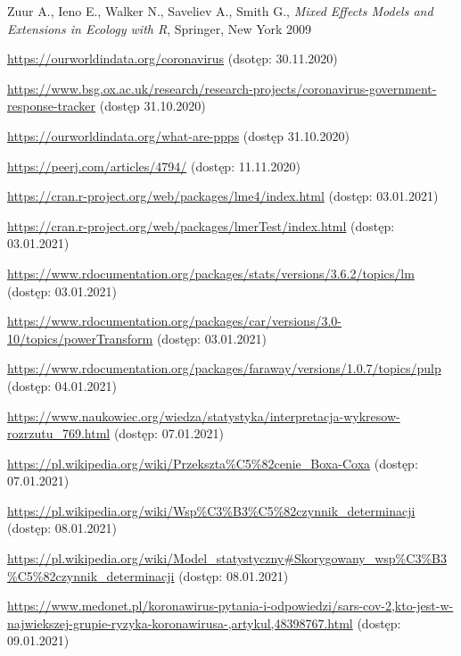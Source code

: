 \documentclass[12pt]{mwbk}
\theoremstyle{plain}
\theoremstyle{definition}
\theoremstyle{definition}
\begin{document}
\begin{thebibliography}{99}
 Zuur A., Ieno E., Walker N.,
Saveliev A., Smith G., \emph{Mixed Effects Models and Extensions in Ecology with R}, Springer, New York 2009


 \url{https://ourworldindata.org/coronavirus} (dsotęp: 30.11.2020)

 \url{https://www.bsg.ox.ac.uk/research/research-projects/coronavirus-government-response-tracker} (dostęp 31.10.2020)

 \url{https://ourworldindata.org/what-are-ppps} (dostęp 31.10.2020)





 \url{https://peerj.com/articles/4794/} (dostęp: 11.11.2020)

 \url{https://cran.r-project.org/web/packages/lme4/index.html} (dostęp: 03.01.2021)

 \url{https://cran.r-project.org/web/packages/lmerTest/index.html} (dostęp: 03.01.2021)

 \url{https://www.rdocumentation.org/packages/stats/versions/3.6.2/topics/lm} (dostęp: 03.01.2021)

 \url{https://www.rdocumentation.org/packages/car/versions/3.0-10/topics/powerTransform} (dostęp: 03.01.2021)


 \url{https://www.rdocumentation.org/packages/faraway/versions/1.0.7/topics/pulp} (dostęp: 04.01.2021)



 \url{https://www.naukowiec.org/wiedza/statystyka/interpretacja-wykresow-rozrzutu_769.html} (dostęp: 07.01.2021)



 \url{https://pl.wikipedia.org/wiki/Przekszta\%C5\%82cenie\_Boxa-Coxa} (dostęp: 07.01.2021)

 \url{https://pl.wikipedia.org/wiki/Wsp\%C3\%B3\%C5\%82czynnik\_determinacji} (dostęp: 08.01.2021)

 \url{https://pl.wikipedia.org/wiki/Model\_statystyczny#Skorygowany\_wsp\%C3\%B3\%C5\%82czynnik\_determinacji} (dostęp: 08.01.2021)

 \url{https://www.medonet.pl/koronawirus-pytania-i-odpowiedzi/sars-cov-2,kto-jest-w-najwiekszej-grupie-ryzyka-koronawirusa-,artykul,48398767.html} (dostęp: 09.01.2021)




\end{thebibliography}
\end{document}
